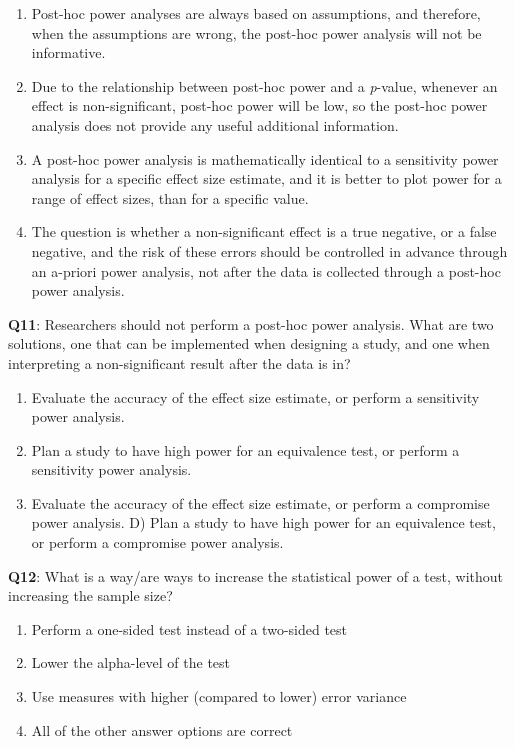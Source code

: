 \documentclass[
  oneside]{book}
\providecommand{\tightlist}{%
  \setlength{\itemsep}{0pt}\setlength{\parskip}{0pt}}
\begin{document}
\begin{enumerate}
\def\labelenumi{\Alph{enumi})}
\tightlist
\item
  Post-hoc power analyses are always based on assumptions, and therefore, when the assumptions are wrong, the post-hoc power analysis will not be informative.
\item
  Due to the relationship between post-hoc power and a \emph{p}-value, whenever an effect is non-significant, post-hoc power will be low, so the post-hoc power analysis does not provide any useful additional information.
\item
  A post-hoc power analysis is mathematically identical to a sensitivity power analysis for a specific effect size estimate, and it is better to plot power for a range of effect sizes, than for a specific value.
\item
  The question is whether a non-significant effect is a true negative, or a false negative, and the risk of these errors should be controlled in advance through an a-priori power analysis, not after the data is collected through a post-hoc power analysis.
\end{enumerate}

\textbf{Q11}: Researchers should not perform a post-hoc power analysis. What are two solutions, one that can be implemented when designing a study, and one when interpreting a non-significant result after the data is in?

\begin{enumerate}
\def\labelenumi{\Alph{enumi})}
\tightlist
\item
  Evaluate the accuracy of the effect size estimate, or perform a sensitivity power analysis.
\item
  Plan a study to have high power for an equivalence test, or perform a sensitivity power analysis.
\item
  Evaluate the accuracy of the effect size estimate, or perform a compromise power analysis. D) Plan a study to have high power for an equivalence test, or perform a compromise power analysis.
\end{enumerate}

\textbf{Q12}: What is a way/are ways to increase the statistical power of a test, without increasing the sample size?

\begin{enumerate}
\def\labelenumi{\Alph{enumi})}
\tightlist
\item
  Perform a one-sided test instead of a two-sided test
\item
  Lower the alpha-level of the test
\item
  Use measures with higher (compared to lower) error variance
\item
  All of the other answer options are correct
\end{enumerate}
\end{document}
